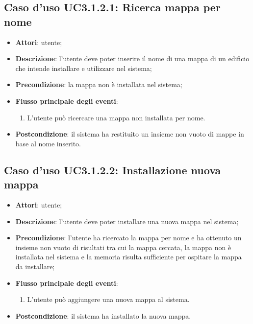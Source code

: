 \documentclass[../AnalisiDeiRequisiti.tex]{subfiles}
\begin{document}
\subsection{Caso d'uso UC3.1.2.1: Ricerca mappa per nome}
\begin{itemize}
	\item \textbf{Attori}: utente;
	\item \textbf{Descrizione}: l'utente deve poter inserire il nome di una mappa di un edificio che intende installare e utilizzare nel sistema; 
	\item \textbf{Precondizione}: la mappa non è installata nel sistema;
	
	\item \textbf{Flusso principale degli eventi}:
	\begin{enumerate}
		\item L'utente può ricercare una mappa non installata per nome.
		
	\end{enumerate}
	\item \textbf{Postcondizione}: il sistema ha restituito un insieme non vuoto di mappe in base al nome inserito.
\end{itemize}
\hypertarget{UC3.1.2.2}{}
\subsection{Caso d'uso UC3.1.2.2: Installazione nuova mappa}
\begin{itemize}
	\item \textbf{Attori}: utente;
	\item \textbf{Descrizione}: l'utente deve poter installare una nuova mappa nel sistema; 
	\item \textbf{Precondizione}: l'utente ha ricercato la mappa per nome e ha ottenuto un insieme non vuoto di risultati tra cui la mappa cercata, la mappa non è installata nel sistema e la memoria risulta sufficiente per ospitare la mappa da installare;
	
	\item \textbf{Flusso principale degli eventi}:
	\begin{enumerate}
		\item L'utente può aggiungere una nuova mappa al sistema.
		
	\end{enumerate}
	\item \textbf{Postcondizione}: il sistema ha installato la nuova mappa.
\end{itemize}
\hypertarget{UC3.1.2.3}{}
\end{document}
